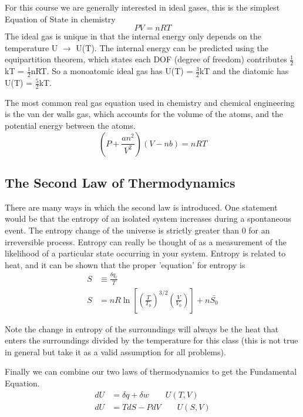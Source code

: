 \documentclass{article}
\begin{document}
For this course we are generally interested in ideal gases, this is the simplest Equation of State in chemistry
\begin{equation}
    PV = nRT
\end{equation}
The ideal gas is unique in that the internal energy only depends on the temperature U $\rightarrow$ U(T).
The internal energy can be predicted using the equipartition theorem, which states each DOF (degree of freedom) contributes $\frac{1}{2}$kT = $\frac{1}{2}$nRT. 
So a monoatomic ideal gas has U(T) = $\frac{3}{2}$kT and the diatomic has U(T) = $\frac{5}{2}$kT. 

The most common real gas equation used in chemistry and chemical engineering is the van der walls gas, which accounts for the volume of the atoms, and the potential energy between the atoms. 
\begin{equation}
    \left( {P + \frac{{an^2 }}{{V^2 }}} \right)\left( {V - nb} \right) = nRT
\end{equation}

\subsection{The Second Law of Thermodynamics}
There are many ways in which the second law is introduced.
One statement would be that the entropy of an isolated system increases during a spontaneous event. 
The entropy change of the universe is strictly greater than 0 for an irreversible process. 
Entropy can really be thought of as a measurement of the likelihood of a particular state occurring in your system. 
Entropy is related to heat, and it can be shown that the proper 'equation' for entropy is 
\begin{equation}
\begin{split}
    S &\equiv \frac{\delta q_{r}}{T} \\
    S &= nR\ln\left[ \left(\frac{T}{T_0} \right)^{3/2} \left(\frac{V}{V_0} \right) \right ] + n\bar{S_0}
    \end{split}
\end{equation}

Note the change in entropy of the surroundings will always be the heat that enters the surroundings divided by the temperature for this class (this is not true in general but take it as a valid assumption for all problems). 

 Finally we can combine our two laws of thermodynamics to get the Fundamental Equation. 
 \begin{equation}
\begin{split}
    dU &= \delta q + \delta w \qquad U(T,V) \\
    dU &= TdS - PdV \qquad U(S,V)
\end{split}
\end{equation}
\end{document}
